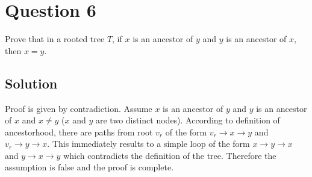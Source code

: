 
\section*{Question 6}

Prove that in a rooted tree $T$, if $x$ is an ancestor of $y$ and $y$ is an ancestor of $x$, then $x = y$.

\subsection*{Solution}

Proof is given by contradiction.
Assume $x$ is an ancestor of $y$ and $y$ is an ancestor of $x$ and $x \neq y$ ($x$ and $y$ are two distinct nodes).
According to definition of ancestorhood, there are paths from root $v_r$ of the form $v_r \rightarrow x \rightarrow y$ and $v_r \rightarrow y \rightarrow x$.
This immediately results to a simple loop of the form $x \rightarrow y \rightarrow x$ and $y \rightarrow x \rightarrow y$ which contradicts the definition of the tree.
Therefore the assumption is false and the proof is complete.
